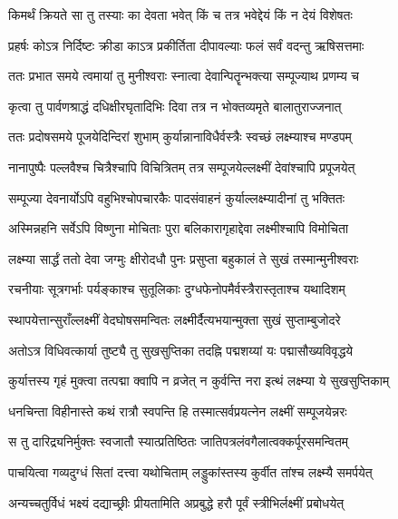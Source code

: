 \twolineshloka
{किमर्थं क्रियते सा तु तस्याः का देवता भवेत्}
{किं च तत्र भवेद्देयं किं न देयं विशेषतः} %

\twolineshloka
{प्रहर्षः कोऽत्र निर्दिष्टः क्रीडा काऽत्र प्रकीर्तिता}
{दीपावल्याः फलं सर्वं वदन्तु ऋषिसत्तमाः} %


\twolineshloka
{ततः प्रभात समये त्वमायां तु मुनीश्वराः}
{स्नात्वा देवान्पितॄन्भक्त्या सम्पूज्याथ प्रणम्य च} %

\twolineshloka
{कृत्वा तु पार्वणश्राद्धं दधिक्षीरघृतादिभिः}
{दिवा तत्र न भोक्तव्यमृते बालातुराज्जनात्} %

\twolineshloka
{ततः प्रदोषसमये पूजयेदिन्दिरां शुभाम्}
{कुर्यान्नानाविधैर्वस्त्रैः स्वच्छं लक्ष्म्याश्च मण्डपम्} %

\twolineshloka
{नानापुष्पैः पल्लवैश्च चित्रैश्चापि विचित्रितम्}
{तत्र सम्पूजयेल्लक्ष्मीं देवांश्चापि प्रपूजयेत्} %

\twolineshloka
{सम्पूज्या देवनार्योऽपि वहुभिश्चोपचारकैः}
{पादसंवाहनं कुर्याल्लक्ष्म्यादीनां तु भक्तितः} %

\twolineshloka
{अस्मिन्नहनि सर्वेऽपि विष्णुना मोचिताः पुरा}
{बलिकारागृहाद्देवा लक्ष्मीश्चापि विमोचिता} %

\twolineshloka
{लक्ष्म्या सार्द्धं ततो देवा जग्मुः क्षीरोदधौ पुनः}
{प्रसुप्ता बहुकालं ते सुखं तस्मान्मुनीश्वराः} %

\twolineshloka
{रचनीयाः सूत्रगर्भाः पर्यङ्काश्च सुतूलिकाः}
{दुग्धफेनोपमैर्वस्त्रैरास्तृताश्च यथादिशम्} %

\twolineshloka
{स्थापयेत्तान्सुराँल्लक्ष्मीं वेदघोषसमन्वितः}
{लक्ष्मीर्दैत्यभयान्मुक्ता सुखं सुप्ताम्बुजोदरे} %

\twolineshloka
{अतोऽत्र विधिवत्कार्या तुष्ट्यै तु सुखसुप्तिका}
{तदह्नि पद्मशय्यां यः पद्मासौख्यविवृद्धये} %

\twolineshloka
{कुर्यात्तस्य गृहं मुक्त्वा तत्पद्मा क्वापि न व्रजेत्}
{न कुर्वन्ति नरा इत्थं लक्ष्म्या ये सुखसुप्तिकाम्} %

\twolineshloka
{धनचिन्ता विहीनास्ते कथं रात्रौ स्वपन्ति हि}
{तस्मात्सर्वप्रयत्नेन लक्ष्मीं सम्पूजयेन्नरः} %

\twolineshloka
{स तु दारिद्र्यनिर्मुक्तः स्वजातौ स्यात्प्रतिष्ठितः}
{जातिपत्रलंवगैलात्वक्कर्पूरसमन्वितम्} %

\twolineshloka
{पाचयित्वा गव्यदुग्धं सितां दत्त्वा यथोचिताम्}
{लड्डुकांस्तस्य कुर्वीत तांश्च लक्ष्म्यै समर्पयेत्} %

\twolineshloka
{अन्यच्चतुर्विधं भक्ष्यं दद्याच्छ्रीः प्रीयतामिति}
{अप्रबुद्धे हरौ पूर्वं स्त्रीभिर्लक्ष्मीं प्रबोधयेत्} %

